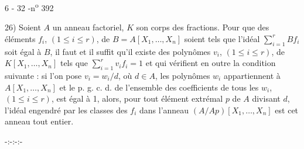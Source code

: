 \begin{center}6 - 32 -\hfill n\textsuperscript{o} 392\end{center}

26) Soient $A$ un anneau factoriel, $K$ son corps des fractions. Pour que des éléments $f_i$, $(1\leq i\leq r)$, de $B=A[X_1,\ldots,X_n]$ soient tels que l'idéal $\sum_{i=1}^r Bf_i$ soit égal à $B$, il faut et il suffit qu'il existe des polynômes $v_i$, $(1\leq i\leq r)$, de $K[X_1,\ldots,X_n]$ tels que $\sum_{i=1}^r v_i f_i=1$ et qui vérifient en outre la condition suivante : si l'on pose $v_i=w_i/d$, où $d\in A$, les polynômes $w_i$ appartiennent à $A[X_1,\ldots,X_n]$ et le p. g. c. d. de l'ensemble des coefficients de tous les $w_i$, $(1\leq i\leq r)$, est égal à 1, alors, pour tout élément extrémal $p$ de $A$ divisant $d$, l'idéal engendré par les classes des $f_i$ dans l'anneau $(A/Ap)[X_1,\ldots,X_n]$ est cet anneau tout entier.

\begin{center}-:-:-:-\end{center}
